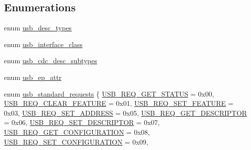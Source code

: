 \subsection*{\-Enumerations}
\begin{DoxyCompactItemize}
\item 
enum \hyperlink{group___p_i_o_s___u_s_b___d_e_f_s_ga15dc30e657ffe4355ba53c2254eb28b5}{usb\-\_\-desc\-\_\-types} 
\item 
enum \hyperlink{group___p_i_o_s___u_s_b___d_e_f_s_ga8c0df0a6c06d39e56e7b15ba8e9d699e}{usb\-\_\-interface\-\_\-class} 
\item 
enum \hyperlink{group___p_i_o_s___u_s_b___d_e_f_s_gadb2dd8c2f3bfb704ccb6629b322f8703}{usb\-\_\-cdc\-\_\-desc\-\_\-subtypes} 
\item 
enum \hyperlink{group___p_i_o_s___u_s_b___d_e_f_s_ga15c24f2eca3cd0a9c359f4e66cb82523}{usb\-\_\-ep\-\_\-attr} 
\item 
enum \hyperlink{group___p_i_o_s___u_s_b___d_e_f_s_ga656cd9a1af7abe6ec812f6ee50b223f9}{usb\-\_\-standard\-\_\-requests} \{ \*
\hyperlink{group___p_i_o_s___u_s_b___d_e_f_s_gga656cd9a1af7abe6ec812f6ee50b223f9aa3f531db07d9720f1c27d383f17b41e7}{\-U\-S\-B\-\_\-\-R\-E\-Q\-\_\-\-G\-E\-T\-\_\-\-S\-T\-A\-T\-U\-S} =  0x00, 
\hyperlink{group___p_i_o_s___u_s_b___d_e_f_s_gga656cd9a1af7abe6ec812f6ee50b223f9a3e7df41451462e9647ea51127b1029cb}{\-U\-S\-B\-\_\-\-R\-E\-Q\-\_\-\-C\-L\-E\-A\-R\-\_\-\-F\-E\-A\-T\-U\-R\-E} =  0x01, 
\hyperlink{group___p_i_o_s___u_s_b___d_e_f_s_gga656cd9a1af7abe6ec812f6ee50b223f9ac6f6f92b41b3626f3bee5585bc8ad259}{\-U\-S\-B\-\_\-\-R\-E\-Q\-\_\-\-S\-E\-T\-\_\-\-F\-E\-A\-T\-U\-R\-E} =  0x03, 
\hyperlink{group___p_i_o_s___u_s_b___d_e_f_s_gga656cd9a1af7abe6ec812f6ee50b223f9a83a1bafe1cb5a0722e661037a7409d38}{\-U\-S\-B\-\_\-\-R\-E\-Q\-\_\-\-S\-E\-T\-\_\-\-A\-D\-D\-R\-E\-S\-S} =  0x05, 
\*
\hyperlink{group___p_i_o_s___u_s_b___d_e_f_s_gga656cd9a1af7abe6ec812f6ee50b223f9a1eefe8e6e18013141d267fc8aba28b10}{\-U\-S\-B\-\_\-\-R\-E\-Q\-\_\-\-G\-E\-T\-\_\-\-D\-E\-S\-C\-R\-I\-P\-T\-O\-R} =  0x06, 
\hyperlink{group___p_i_o_s___u_s_b___d_e_f_s_gga656cd9a1af7abe6ec812f6ee50b223f9a2297324ad7de09fcff189cb08b6e3357}{\-U\-S\-B\-\_\-\-R\-E\-Q\-\_\-\-S\-E\-T\-\_\-\-D\-E\-S\-C\-R\-I\-P\-T\-O\-R} =  0x07, 
\hyperlink{group___p_i_o_s___u_s_b___d_e_f_s_gga656cd9a1af7abe6ec812f6ee50b223f9a70ecb7290067da81c599637126d78c32}{\-U\-S\-B\-\_\-\-R\-E\-Q\-\_\-\-G\-E\-T\-\_\-\-C\-O\-N\-F\-I\-G\-U\-R\-A\-T\-I\-O\-N} =  0x08, 
\hyperlink{group___p_i_o_s___u_s_b___d_e_f_s_gga656cd9a1af7abe6ec812f6ee50b223f9a8469bf7cfc2e560c005b564fe66db0ee}{\-U\-S\-B\-\_\-\-R\-E\-Q\-\_\-\-S\-E\-T\-\_\-\-C\-O\-N\-F\-I\-G\-U\-R\-A\-T\-I\-O\-N} =  0x09, 

\end{DoxyCompactItemize}
